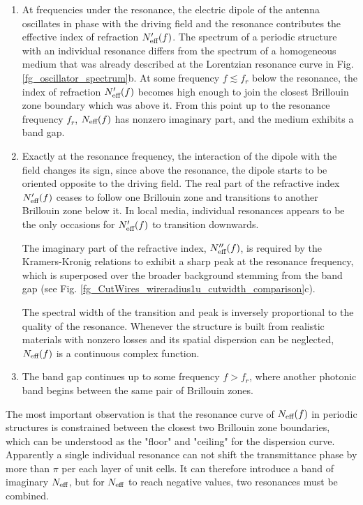 \begin{enumerate}
\item{At frequencies under the resonance, the electric dipole of the antenna oscillates in phase with the driving field and the resonance contributes the effective index of refraction $N_{\text{eff} }'(f)$. 
The spectrum of a periodic structure with an individual resonance differs from the spectrum of a homogeneous medium that was already described at the Lorentzian resonance curve in Fig. \ref{fg_oscillator_spectrum}b.
At some frequency $f \lesssim f_r$ below the resonance, the index of refraction $N_{\text{eff} }'(f)$ becomes high enough to join the closest Brillouin zone boundary which was above it. From this point up to the resonance frequency $f_r$, $N_{\text{eff} }(f)$ has nonzero imaginary part, and the medium exhibits a band gap.
} 
\item{Exactly at the resonance frequency, the interaction of the dipole with the field changes its sign, since above the resonance, the dipole starts to be oriented opposite to the driving field. 
The real part of the refractive index $N_{\text{eff} }'(f)$ ceases to follow one Brillouin zone and transitions to another Brillouin zone below it. In local media, individual resonances appears to be the only occasions for $N_{\text{eff} }'(f)$ to transition downwards.

The imaginary part of the refractive index, $N_{\text{eff} }''(f)$, is required by the Kramers-Kronig relations to exhibit a sharp peak at the resonance frequency, which is superposed over the broader background stemming from the band gap (see Fig. \ref{fg_CutWires_wireradius1u_cutwidth_comparison}c). 

The spectral width of the transition and peak is inversely proportional to the quality of the resonance. Whenever the structure is built from realistic materials with nonzero losses and its spatial dispersion can be neglected, $N_{\text{eff} }(f)$ is a continuous complex function.
} 
\item{The band gap continues up to some frequency $f > f_r$, where another photonic band begins between the same pair of Brillouin zones.  
} 
\end{enumerate}

The most important observation is that the resonance curve of $N_{\text{eff} }(f)$ in periodic structures is constrained between the closest two Brillouin zone boundaries, which can be understood as the "floor" and "ceiling" for the dispersion curve. Apparently a single individual resonance can not shift the transmittance phase by more than $\pi$ per each layer of unit cells. It can therefore introduce a band of imaginary $N_{\text{eff} }$, but for $N_{\text{eff} }$ to reach negative values, two resonances must be combined.

